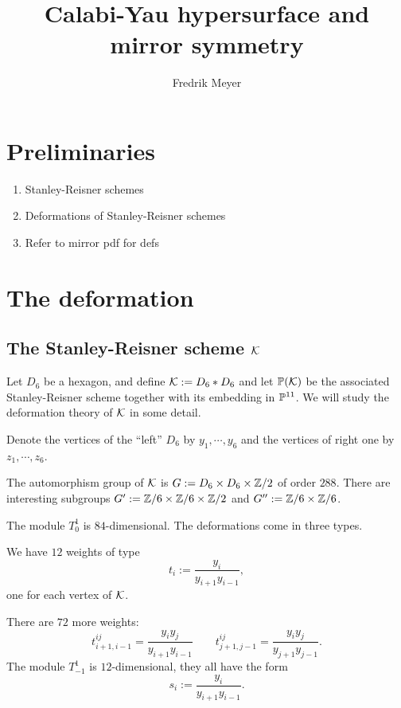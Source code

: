 \documentclass[11pt, english]{article}
\begin{document}
\title{Calabi-Yau hypersurface and mirror symmetry}
\author{Fredrik Meyer}
\maketitle 

\section{Preliminaries}
\begin{enumerate}
\item Stanley-Reisner schemes
\item Deformations of Stanley-Reisner schemes
\item Refer to mirror pdf for defs
\end{enumerate}

\section{The deformation}

\subsection{The Stanley-Reisner scheme $\mathcal K$}
Let $D_6$ be a hexagon, and define $\mathcal K := D_6 \ast D_6$ and let $\mathbb{P}(\mathcal K)$ be the associated Stanley-Reisner scheme together with its embedding in $\mathbb{P}^{11}$. We will study the deformation theory of $\mathcal K$ in some detail.

Denote the vertices of the ``left'' $D_6$ by $y_1,\cdots,y_6$ and the vertices of right one by $z_1,\cdots,z_6$.

\begin{lemma}
The automorphism group of $\mathcal K$ is $G := D_6 \times D_6 \times \mathbb{Z}/2$ of order $288$. There are interesting subgroups $G' := \mathbb{Z}/6 \times \mathbb{Z}/6 \times \mathbb{Z}/2$ and $G'' := \mathbb{Z}/6 \times \mathbb{Z}/6$.
\end{lemma}

\begin{prop}
\label{t1}
The module $T^1_0$ is $84$-dimensional. The deformations come in three types.

We have $12$ weights of type
$$
t_{i} := \frac{y_i}{y_{i+1}y_{i-1}},
$$
one for each vertex of $\mathcal K$.

There are $72$ more weights:
$$
t^{ij}_{i+1,i-1}=\frac{y_iy_j}{y_{i+1}y_{i-1}} \qquad t^{ij}_{j+1,j-1}=\frac{y_iy_j}{y_{j+1}y_{j-1}}.
$$
The module $T^1_{-1}$ is $12$-dimensional, they all have the form
$$
s_i := \frac{y_i}{y_{i+1}y_{i-1}}.
$$
\end{prop}
\end{document}
